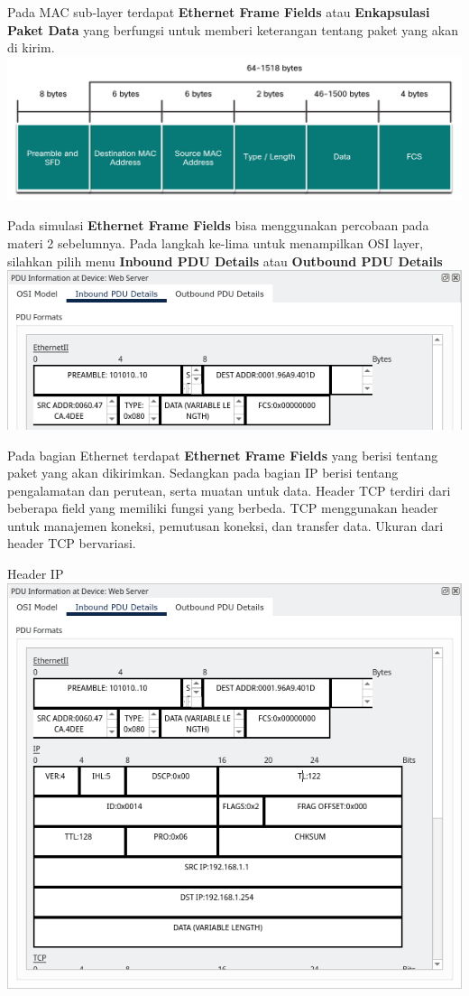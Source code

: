 \documentclass{article}
\begin{document}
\begin{flushleft}
        Pada MAC sub-layer terdapat \textbf{Ethernet Frame Fields} atau \textbf{Enkapsulasi Paket Data} yang berfungsi untuk memberi keterangan tentang paket yang akan di kirim.
        \includegraphics[scale=0.35]{3-mac-frame.png}

        Pada simulasi \textbf{Ethernet Frame Fields} bisa menggunakan percobaan pada materi 2 sebelumnya.
        Pada langkah ke-lima untuk menampilkan OSI layer, silahkan pilih menu \textbf{Inbound PDU Details} atau \textbf{Outbound PDU Details}
        \includegraphics[scale=0.6]{3-mac-frame-eth-0.png}

        Pada bagian Ethernet terdapat \textbf{Ethernet Frame Fields} yang berisi tentang paket yang akan dikirimkan. 
        Sedangkan pada bagian IP berisi tentang pengalamatan dan perutean, serta muatan untuk data. Header TCP terdiri dari beberapa field yang memiliki fungsi yang berbeda. TCP menggunakan header untuk manajemen koneksi, pemutusan koneksi, dan transfer data. Ukuran dari header TCP bervariasi.
        \newline
        
        Header IP \newline
        \includegraphics[scale=0.5]{3-mac-frame-eth.png}


\end{flushleft}
\end{document}
